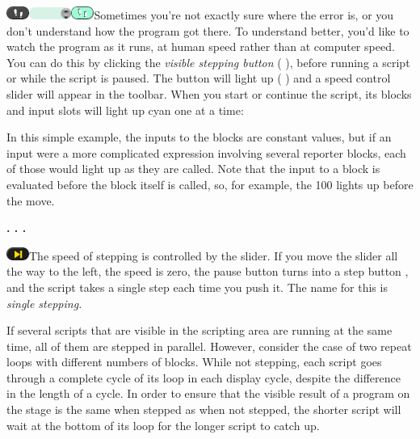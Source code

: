 \includegraphics[width=0.29167in,height=0.16667in]{media/image121.png}\includegraphics[width=0.54563in,height=0.15278in]{media/image122.png}\includegraphics[width=0.29167in,height=0.16667in]{media/image123.png}Sometimes
you're not exactly sure where the error is, or you don't understand how
the program got there. To understand better, you'd like to watch the
program as it runs, at human speed rather than at computer speed. You
can do this by clicking the \emph{visible stepping button} ( ), before
running a script or while the script is paused. The button will light up
( ) and a speed control slider will appear in the toolbar. When you
start or continue the script, its blocks and input slots will light up
cyan one at a time:

In this simple example, the inputs to the blocks are constant values,
but if an input were a more complicated expression involving several
reporter blocks, each of those would light up as they are called. Note
that the input to a block is evaluated before the block itself is
called, so, for example, the 100 lights up before the move.

\textbf{. . .}

\includegraphics[width=0.29167in,height=0.16667in]{media/image134.png}The
speed of stepping is controlled by the slider. If you move the slider
all the way to the left, the speed is zero, the pause button turns into
a step button , and the script takes a single step each time you push
it. The name for this is \emph{single stepping.}

If several scripts that are visible in the scripting area are running at
the same time, all of them are stepped in parallel. However, consider
the case of two repeat loops with different numbers of blocks. While not
stepping, each script goes through a complete cycle of its loop in each
display cycle, despite the difference in the length of a cycle. In order
to ensure that the visible result of a program on the stage is the same
when stepped as when not stepped, the shorter script will wait at the
bottom of its loop for the longer script to catch up.

